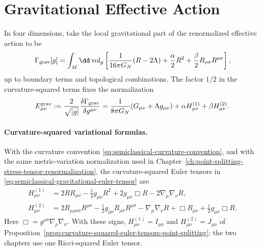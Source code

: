 \section{Gravitational Effective Action}

In four dimensions, take the local gravitational part of the renormalized
effective action to be
\begin{equation}
  \Gamma_{\rm grav}[g]
  =
  \int_M\dd\operatorname{vol}_g
  \left[
    \frac{1}{16\pi G_N}(R-2\Lambda)
    +
    \frac{\alpha}{2}R^2
    +
    \frac{\beta}{2}R_{\rho\sigma}R^{\rho\sigma}
  \right],
  \label{eq:semiclassical-gravitational-action}
\end{equation}
up to boundary terms and topological combinations.  The factor \(1/2\) in
the curvature-squared terms fixes the normalization
\begin{equation}
  E_{\mu\nu}^{\rm grav}
  :=
  \frac{2}{\sqrt{|g|}}\frac{\delta\Gamma_{\rm grav}}{\delta g^{\mu\nu}}
  =
  \frac1{8\pi G_N}(G_{\mu\nu}+\Lambda g_{\mu\nu})
  +
  \alpha H^{(1)}_{\mu\nu}
  +
  \beta H^{(2)}_{\mu\nu}.
  \label{eq:semiclassical-gravitational-euler-tensor}
\end{equation}
\paragraph{Curvature-squared variational formulas.}
With the curvature convention
\eqref{eq:semiclassical-curvature-convention}, and with the same
metric-variation normalization used in
Chapter~\ref{ch:point-splitting-stress-tensor-renormalization}, the
curvature-squared Euler tensors in
\eqref{eq:semiclassical-gravitational-euler-tensor} are
\begin{equation}
\begin{aligned}
  H^{(1)}_{\mu\nu}
  &=
  2RR_{\mu\nu}
  -\frac12g_{\mu\nu}R^2
  +
  2g_{\mu\nu}\Box R
  -
  2\nabla_\mu\nabla_\nu R,\\
  H^{(2)}_{\mu\nu}
  &=
  2R_{\mu\rho\nu\sigma}R^{\rho\sigma}
  -\frac12g_{\mu\nu}R_{\rho\sigma}R^{\rho\sigma}
  -
  \nabla_\mu\nabla_\nu R
  +
  \Box R_{\mu\nu}
  +
  \frac12g_{\mu\nu}\Box R .
\end{aligned}
  \label{eq:semiclassical-H-tensors}
\end{equation}
Here \(\Box=g^{\rho\sigma}\nabla_\rho\nabla_\sigma\).
With these signs, \(H^{(1)}_{\mu\nu}=I_{\mu\nu}\) and
\(H^{(2)}_{\mu\nu}=J_{\mu\nu}\) of
Proposition~\ref{prop:curvature-squared-euler-tensors-point-splitting}; the
two chapters use one Ricci-squared Euler tensor.

